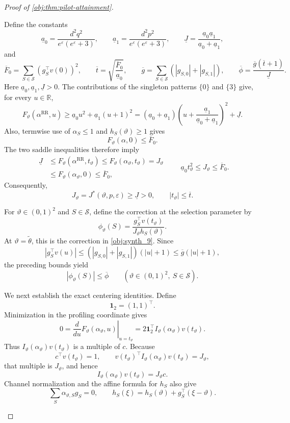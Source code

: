 \documentclass[11pt]{article}
\begin{document}
\begin{proof}[Proof of \cref{obj:thm:pilot-attainment}]
\begin{enumerate}
Define the constants
\[
\underline a_0=\frac{d^2q^2}{e^\varepsilon(e^\varepsilon+3)},
\qquad
\underline a_1=\frac{d^2p^2}{e^\varepsilon(e^\varepsilon+3)},
\qquad
\underline J=\frac{\underline a_0\underline a_1}
{\underline a_0+\underline a_1},
\]
and
\[
\overline F_0=\sum_{S\in\mathcal S}(g_S^\top v(0))^2,
\qquad
\overline t=\sqrt{\frac{\overline F_0}{\underline a_0}},
\qquad
\overline g=\sum_{S\in\mathcal S}(|g_{S,0}|+|g_{S,1}|),
\qquad
\overline\phi=\frac{\overline g(\overline t+1)}{\underline J}.
\]
Here \(\underline a_0,\underline a_1,\underline J>0\). The contributions of the singleton patterns \(\{0\}\) and \(\{3\}\) give, for every \(u\in\mathbb R\),
\[
F_\vartheta(\alpha^{\mathrm{RR}},u)
\ge \underline a_0u^2+\underline a_1(u+1)^2
=(\underline a_0+\underline a_1)
\left(u+\frac{\underline a_1}{\underline a_0+\underline a_1}\right)^2
+\underline J.
\]
Also, termwise use of \(\alpha_S\le1\) and \(h_S(\vartheta)\ge1\) gives
\[
F_\vartheta(\alpha,0)\le\overline F_0.
\]
The two saddle inequalities therefore imply
\[
\begin{aligned}
\underline J
&\le F_\vartheta(\alpha^{\mathrm{RR}},t_\vartheta)
\le F_\vartheta(\alpha_\vartheta,t_\vartheta)
=J_\vartheta\\
&\le F_\vartheta(\alpha_\vartheta,0)
\le\overline F_0,
\end{aligned}
\qquad
\underline a_0t_\vartheta^2\le J_\vartheta\le\overline F_0.
\]
Consequently,
\[
J_\vartheta=J^*(\vartheta,p,\varepsilon)\ge\underline J>0,
\qquad |t_\vartheta|\le\overline t.
\]

For \(\vartheta\in(0,1)^2\) and \(S\in\mathcal S\), define the correction at the selection parameter by
\[
\phi_\vartheta(S)
=\frac{g_S^\top v(t_\vartheta)}
{J_\vartheta h_S(\vartheta)}.
\]
At \(\vartheta=\widetilde\theta\), this is the correction in \cref{obj:synth_9}. Since
\[
|g_S^\top v(u)|
\le (|g_{S,0}|+|g_{S,1}|)(|u|+1)
\le\overline g(|u|+1),
\]
the preceding bounds yield
\[
|\phi_\vartheta(S)|\le\overline\phi
\qquad
(\vartheta\in(0,1)^2,\ S\in\mathcal S).
\]

We next establish the exact centering identities. Define
\[
\mathbf1_2=(1,1)^\top.
\]
Minimization in the profiling coordinate gives
\[
0=\left.\frac{d}{du}F_\vartheta(\alpha_\vartheta,u)
\right|_{u=t_\vartheta}
=2\mathbf1_2^\top I_\vartheta(\alpha_\vartheta)v(t_\vartheta).
\]
Thus \(I_\vartheta(\alpha_\vartheta)v(t_\vartheta)\) is a multiple of \(c\). Because
\[
c^\top v(t_\vartheta)=1,
\qquad
v(t_\vartheta)^\top I_\vartheta(\alpha_\vartheta)v(t_\vartheta)
=J_\vartheta,
\]
that multiple is \(J_\vartheta\), and hence
\[
I_\vartheta(\alpha_\vartheta)v(t_\vartheta)=J_\vartheta c.
\]
Channel normalization and the affine formula for \(h_S\) also give
\[
\sum_S\alpha_{\vartheta,S}g_S=0,
\qquad
h_S(\xi)=h_S(\vartheta)+g_S^\top(\xi-\vartheta).
\]


\end{enumerate}
\end{proof}
\end{document}
